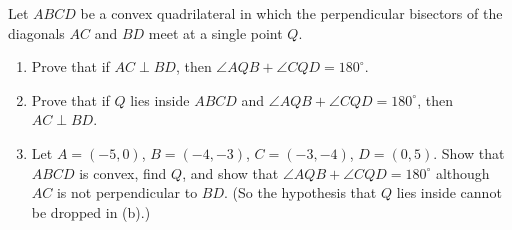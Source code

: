 Let $ABCD$ be a convex quadrilateral in which the perpendicular bisectors of the diagonals $AC$ and $BD$ meet at a single point $Q$.
\begin{enumerate}
\item[(a)] Prove that if $AC\perp BD$, then $\angle AQB+\angle CQD=180^\circ$.
\item[(b)] Prove that if $Q$ lies inside $ABCD$ and $\angle AQB+\angle CQD=180^\circ$, then $AC\perp BD$.
\item[(c)] Let $A=(-5,0)$, $B=(-4,-3)$, $C=(-3,-4)$, $D=(0,5)$. Show that $ABCD$ is convex, find $Q$, and show that $\angle AQB+\angle CQD=180^\circ$ although $AC$ is not perpendicular to $BD$. (So the hypothesis that $Q$ lies inside cannot be dropped in (b).)
\end{enumerate}
